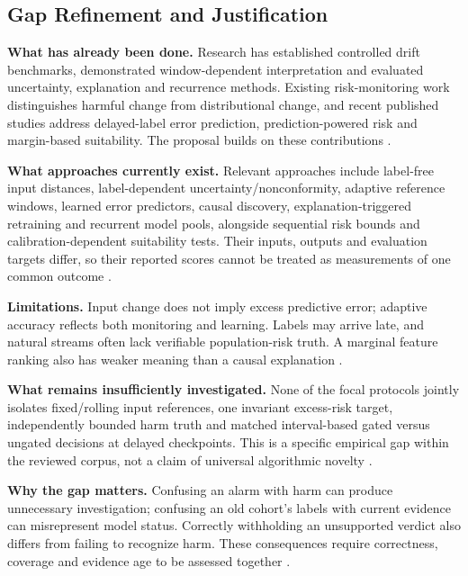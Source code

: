 \documentclass[11pt,a4paper]{article}
\begin{document}
\subsection*{Gap Refinement and Justification}
\textbf{What has already been done.} Research has established controlled
drift benchmarks, demonstrated window-dependent interpretation and evaluated
uncertainty, explanation and recurrence methods. Existing risk-monitoring
work distinguishes harmful change from distributional change, and recent
published studies address delayed-label error prediction, prediction-powered
risk and margin-based suitability.
The proposal builds on these contributions
\cite{cerqueira,window,pudd,prodem,timans,pprm,suitability,podkopaev}.

\textbf{What approaches currently exist.} Relevant approaches include
label-free input distances, label-dependent uncertainty/nonconformity,
adaptive reference windows, learned error predictors, causal discovery, explanation-triggered retraining
and recurrent model pools, alongside sequential risk bounds and
calibration-dependent suitability tests. Their inputs, outputs and evaluation
targets differ, so their reported scores cannot be treated as measurements of
one common outcome
\cite{batched,pudd,window,causal,shapenergy,prodem,conformal,timans,pprm,suitability}.

\textbf{Limitations.} Input change does not imply excess predictive error;
adaptive accuracy reflects both monitoring and learning. Labels may arrive late,
and natural streams often lack verifiable population-risk truth. A marginal
feature ranking also has weaker meaning than a causal explanation
\cite{window,pudd,causal,souza,alencar}.

\textbf{What remains insufficiently investigated.} None of the focal protocols
jointly isolates fixed/rolling input references, one invariant excess-risk
target, independently bounded harm truth and matched interval-based gated versus
ungated decisions at delayed checkpoints. This is a specific empirical gap
within the reviewed corpus, not a claim of universal algorithmic novelty
\cite{window,prodem,pprm,suitability}.

\textbf{Why the gap matters.} Confusing an alarm with harm can
produce unnecessary investigation; confusing an old cohort's labels with
current evidence can misrepresent model status. Correctly withholding an
unsupported verdict also differs from failing to recognize harm. These
consequences require correctness, coverage and evidence age to be assessed
together \cite{window,pudd,driftvis}.
\end{document}
